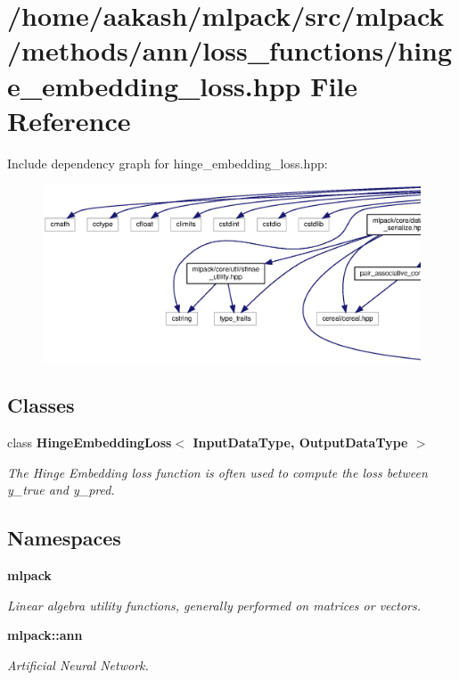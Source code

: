 \section{/home/aakash/mlpack/src/mlpack/methods/ann/loss\+\_\+functions/hinge\+\_\+embedding\+\_\+loss.hpp File Reference}
\label{hinge__embedding__loss_8hpp}
Include dependency graph for hinge\+\_\+embedding\+\_\+loss.\+hpp\+:
\nopagebreak
\begin{figure}[H]
\begin{center}
\leavevmode
\includegraphics[width=350pt]{hinge__embedding__loss_8hpp__incl}
\end{center}
\end{figure}
\subsection*{Classes}
\begin{DoxyCompactItemize}
\item 
class \textbf{ Hinge\+Embedding\+Loss$<$ Input\+Data\+Type, Output\+Data\+Type $>$}
\begin{DoxyCompactList}\small\item\em The Hinge Embedding loss function is often used to compute the loss between y\+\_\+true and y\+\_\+pred. \end{DoxyCompactList}\end{DoxyCompactItemize}
\subsection*{Namespaces}
\begin{DoxyCompactItemize}
\item 
 \textbf{ mlpack}
\begin{DoxyCompactList}\small\item\em Linear algebra utility functions, generally performed on matrices or vectors. \end{DoxyCompactList}\item 
 \textbf{ mlpack\+::ann}
\begin{DoxyCompactList}\small\item\em Artificial Neural Network. \end{DoxyCompactList}\end{DoxyCompactItemize}


